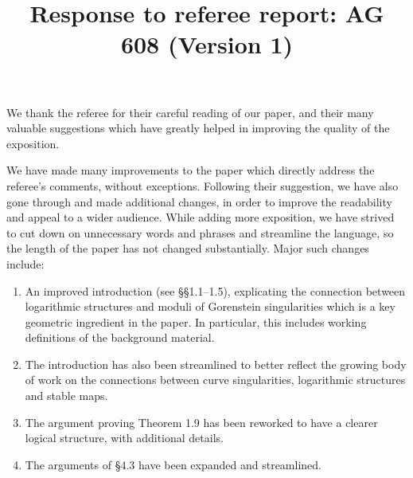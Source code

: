 \documentclass[11pt]{amsart}
\theoremstyle{plain}
\theoremstyle{remark}
\theoremstyle{definition}
\begin{document}
 
\title{Response to referee report: AG 608 (Version 1)}
\maketitle

\noindent We thank the referee for their careful reading of our paper, and their many valuable suggestions which have greatly helped in improving the quality of the exposition.

We have made many improvements to the paper which directly address the referee's comments, without exceptions. Following their suggestion, we have also gone through and made additional changes, in order to improve the readability and appeal to a wider audience. While adding more exposition, we have strived to cut down on unnecessary words and phrases and streamline the language, so the length of the paper has not changed substantially. Major such changes include:
\begin{enumerate}
	\item An improved introduction (see \S\S 1.1--1.5), explicating the connection between logarithmic structures and moduli of Gorenstein singularities which is a key geometric ingredient in the paper. In particular, this includes working definitions of the background material. 
	\item The introduction has also been streamlined to better reflect the growing body of work on the connections between curve singularities, logarithmic structures and stable maps.
	\item The argument proving Theorem 1.9 has been reworked to have a clearer logical structure, with additional details. 
	\item The arguments of \S 4.3 have been expanded and streamlined.
\end{enumerate}
\end{document}
